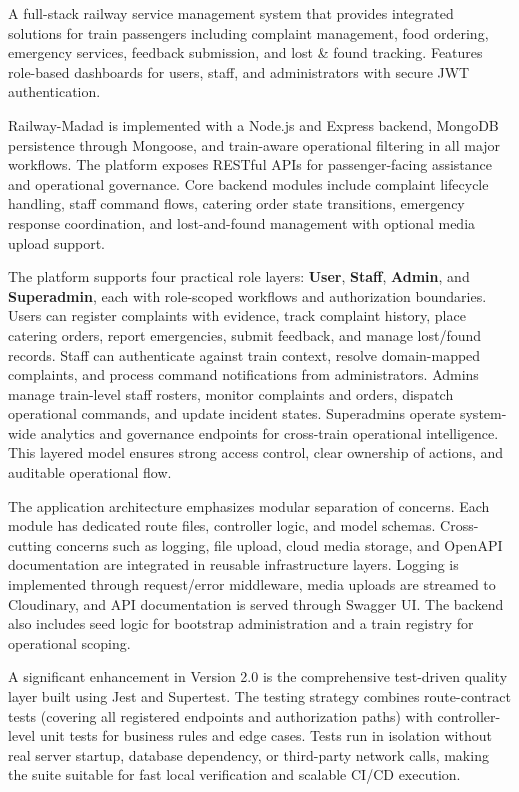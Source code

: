 \documentclass[12pt,a4paper]{report}
\begin{document}
A full-stack railway service management system that provides integrated solutions for train passengers including complaint management, food ordering, emergency services, feedback submission, and lost \& found tracking. Features role-based dashboards for users, staff, and administrators with secure JWT authentication.

Railway-Madad is implemented with a Node.js and Express backend, MongoDB persistence through Mongoose, and train-aware operational filtering in all major workflows. The platform exposes RESTful APIs for passenger-facing assistance and operational governance. Core backend modules include complaint lifecycle handling, staff command flows, catering order state transitions, emergency response coordination, and lost-and-found management with optional media upload support.

The platform supports four practical role layers: \textbf{User}, \textbf{Staff}, \textbf{Admin}, and \textbf{Superadmin}, each with role-scoped workflows and authorization boundaries. Users can register complaints with evidence, track complaint history, place catering orders, report emergencies, submit feedback, and manage lost/found records. Staff can authenticate against train context, resolve domain-mapped complaints, and process command notifications from administrators. Admins manage train-level staff rosters, monitor complaints and orders, dispatch operational commands, and update incident states. Superadmins operate system-wide analytics and governance endpoints for cross-train operational intelligence. This layered model ensures strong access control, clear ownership of actions, and auditable operational flow.

The application architecture emphasizes modular separation of concerns. Each module has dedicated route files, controller logic, and model schemas. Cross-cutting concerns such as logging, file upload, cloud media storage, and OpenAPI documentation are integrated in reusable infrastructure layers. Logging is implemented through request/error middleware, media uploads are streamed to Cloudinary, and API documentation is served through Swagger UI. The backend also includes seed logic for bootstrap administration and a train registry for operational scoping.

A significant enhancement in Version 2.0 is the comprehensive test-driven quality layer built using Jest and Supertest. The testing strategy combines route-contract tests (covering all registered endpoints and authorization paths) with controller-level unit tests for business rules and edge cases. Tests run in isolation without real server startup, database dependency, or third-party network calls, making the suite suitable for fast local verification and scalable CI/CD execution.
\end{document}
